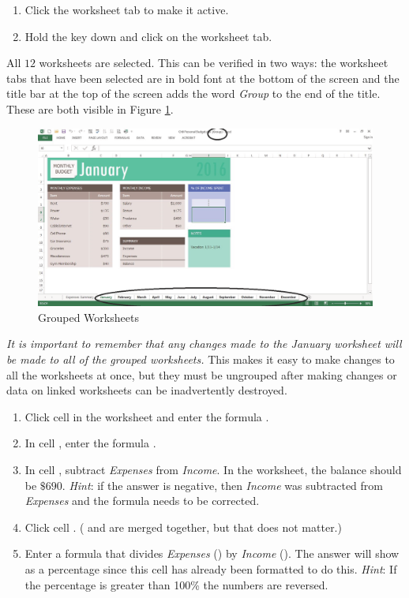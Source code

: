 \begin{enumerate}
	\item Click the  worksheet tab to make it active.
	\item Hold the  key down and click on the  worksheet tab.
\end{enumerate}

All $ 12 $ worksheets are selected. This can be verified in two ways: the worksheet tabs that have been selected are in bold font at the bottom of the screen and the title bar at the top of the screen adds the word \textit{Group} to the end of the title. These are both visible in Figure \ref{06:fig04}.

\begin{figure}[H]
	\centering
	\includegraphics[width=\maxwidth{.95\linewidth}]{gfx/ch06_fig04}
	\caption{Grouped Worksheets}
	\label{06:fig04}
\end{figure}

\textit{It is important to remember that any changes made to the January worksheet will be made to all of the grouped worksheets.} This makes it easy to make changes to all the worksheets at once, but they must be ungrouped after making changes or data on linked worksheets can be inadvertently destroyed. 

\begin{enumerate}
	\item Click cell  in the  worksheet and enter the formula .
	\item In cell , enter the formula .
	\item In cell , subtract \textit{Expenses} from \textit{Income}. In the  worksheet, the balance should be $ \$690 $. \textit{Hint}: if the answer is negative, then \textit{Income} was subtracted from \textit{Expenses} and the formula needs to be corrected.
	\item Click cell . ( and  are merged together, but that does not matter.)
	\item Enter a formula that divides \textit{Expenses} () by \textit{Income} (). The answer will show as a percentage since this cell has already been formatted to do this. \textit{Hint}: If the percentage is greater than 100\% the numbers are reversed.
\end{enumerate}

